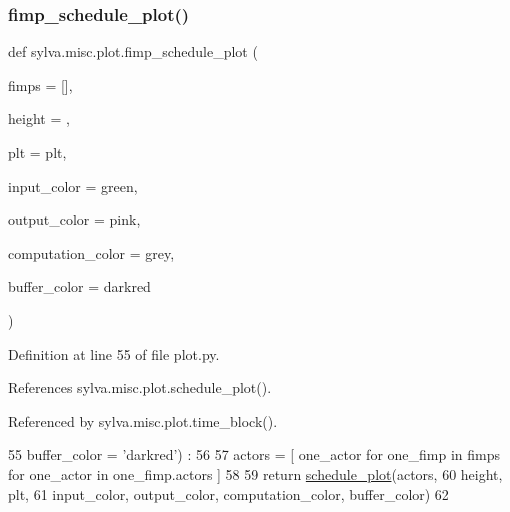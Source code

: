 \subsubsection{\texorpdfstring{fimp\+\_\+schedule\+\_\+plot()}{fimp\_schedule\_plot()}}
{\footnotesize\ttfamily def sylva.\+misc.\+plot.\+fimp\+\_\+schedule\+\_\+plot (\begin{DoxyParamCaption}\item[{}]{fimps = {\ttfamily \mbox{[}\mbox{]}},  }\item[{}]{height = {},  }\item[{}]{plt = {\ttfamily plt},  }\item[{}]{input\+\_\+color = {\ttfamily \textquotesingle{}green\textquotesingle{}},  }\item[{}]{output\+\_\+color = {\ttfamily \textquotesingle{}pink\textquotesingle{}},  }\item[{}]{computation\+\_\+color = {\ttfamily \textquotesingle{}grey\textquotesingle{}},  }\item[{}]{buffer\+\_\+color = {\ttfamily \textquotesingle{}darkred\textquotesingle{}} }\end{DoxyParamCaption})}



Definition at line 55 of file plot.\+py.



References sylva.\+misc.\+plot.\+schedule\+\_\+plot().



Referenced by sylva.\+misc.\+plot.\+time\+\_\+block().


\begin{DoxyCode}
55     buffer\_color = \textcolor{stringliteral}{'darkred'}) :
56 
57     actors = [ one\_actor \textcolor{keywordflow}{for} one\_fimp \textcolor{keywordflow}{in} fimps \textcolor{keywordflow}{for} one\_actor \textcolor{keywordflow}{in} one\_fimp.actors ]
58 
59     \textcolor{keywordflow}{return} \hyperlink{namespacesylva_1_1misc_1_1plot_a2937dd66c98822d9914353fc15105e14}{schedule\_plot}(actors,
60       height, plt,
61       input\_color, output\_color, computation\_color, buffer\_color)
62 
\end{DoxyCode}
\mbox{\label{namespacesylva_1_1misc_1_1plot_a2937dd66c98822d9914353fc15105e14}} 
